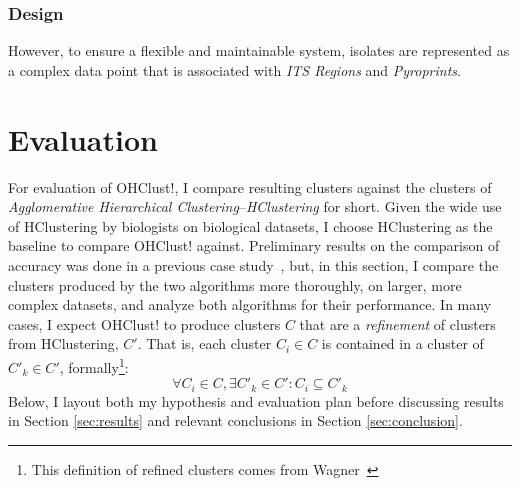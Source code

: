 \documentclass[12pt]{ucthesis}
\begin{document}
      \subsection{Design}\label{sec:design}
         However, to ensure a flexible and
         maintainable system, isolates are represented as a complex data point
         that is associated with \textit{ITS Regions} and \textit{Pyroprints}.

\chapter{Evaluation}\label{chap:evaluation}
   For evaluation of OHClust!, I compare resulting clusters against the
   clusters of \textit{Agglomerative Hierarchical
   Clustering}--\textit{HClustering} for short. Given the wide use of
   HClustering by biologists on biological datasets, I choose HClustering as
   the baseline to compare OHClust! against. Preliminary results on the
   comparison of accuracy was done in a previous case
   study~\cite{Montana:ChronoCluster}, but, in this section, I compare the
   clusters produced by the two algorithms more thoroughly, on larger, more
   complex datasets, and analyze both algorithms for their performance. In many
   cases, I expect OHClust! to produce clusters $C$ that are a
   \textit{refinement} of clusters from HClustering, $C'$.  That is, each
   cluster $C_i \in C$ is contained in a cluster of $C'_k \in C'$,
   formally\footnote{This definition of refined clusters comes from
   Wagner~\cite{Wagner:Overview}}:
   $$\forall C_i \in C, \exists C'_k \in C' : C_i \subseteq C'_k$$
   Below, I layout both my hypothesis and evaluation plan before discussing
   results in Section \ref{sec:results} and relevant conclusions in Section
   \ref{sec:conclusion}.
\end{document}
